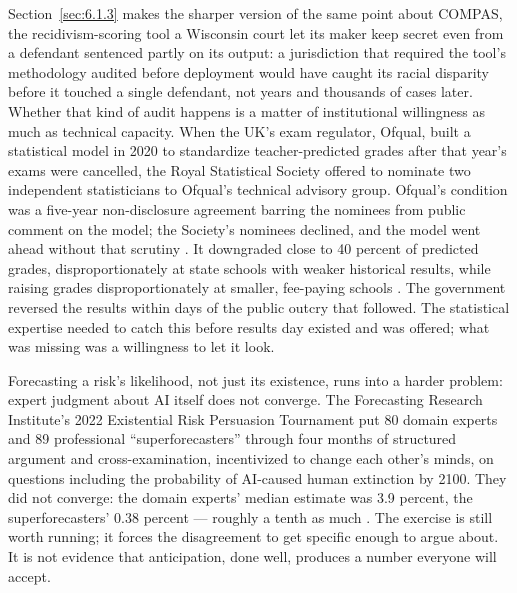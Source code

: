 Section~\ref{sec:6.1.3} makes the sharper version of the same point about COMPAS, the recidivism-scoring tool a Wisconsin court let its maker keep secret even from a defendant sentenced partly on its output: a jurisdiction that required the tool's methodology audited before deployment would have caught its racial disparity before it touched a single defendant, not years and thousands of cases later. Whether that kind of audit happens is a matter of institutional willingness as much as technical capacity. When the UK's exam regulator, Ofqual, built a statistical model in 2020 to standardize teacher-predicted grades after that year's exams were cancelled, the Royal Statistical Society offered to nominate two independent statisticians to Ofqual's technical advisory group. Ofqual's condition was a five-year non-disclosure agreement barring the nominees from public comment on the model; the Society's nominees declined, and the model went ahead without that scrutiny \autocite{rss2020ofqual}. It downgraded close to 40 percent of predicted grades, disproportionately at state schools with weaker historical results, while raising grades disproportionately at smaller, fee-paying schools \autocite{cnbc2020ofqual}. The government reversed the results within days of the public outcry that followed. The statistical expertise needed to catch this before results day existed and was offered; what was missing was a willingness to let it look.

Forecasting a risk's likelihood, not just its existence, runs into a harder problem: expert judgment about AI itself does not converge. The Forecasting Research Institute's 2022 Existential Risk Persuasion Tournament put 80 domain experts and 89 professional “superforecasters” through four months of structured argument and cross-examination, incentivized to change each other's minds, on questions including the probability of AI-caused human extinction by 2100. They did not converge: the domain experts' median estimate was 3.9 percent, the superforecasters' 0.38 percent — roughly a tenth as much \autocite{karger2023existential}. The exercise is still worth running; it forces the disagreement to get specific enough to argue about. It is not evidence that anticipation, done well, produces a number everyone will accept.

